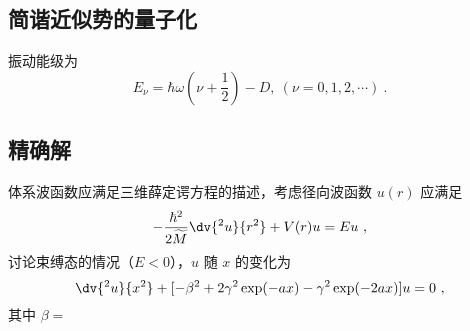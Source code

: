 \subsection{简谐近似势的量子化}
振动能级为
$$E_\nu = \hbar \omega (\nu + \frac12) - D , \ (\nu = 0, 1, 2, \cdots) ~.$$

\subsection{精确解}
体系波函数应满足三维薛定谔方程的描述，考虑径向波函数 $u(r)$ 应满足
\begin{equation}
-\frac{\hbar^2}{2 \widetilde M} \dv{^2 u}{r^2} + V(r) u = Eu ~,
\end{equation}
讨论束缚态的情况（$E<0$），$u$ 随 $x$ 的变化为
\begin{equation}
\dv{^2 u}{x^2} + [-\beta^2 + 2 \gamma^2 \exp(-ax) - \gamma^2 \exp(-2ax)]u = 0 ~,
\end{equation}
其中 $\beta = $